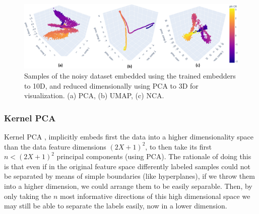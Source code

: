 \documentclass[11pt, a4paper, twoside]{article} %
\begin{document}
\begin{figure}[h!] 
     \centering 
    \includegraphics[width=0.95\linewidth]{emb1.PNG}
    \caption{ Samples of the noisy dataset embedded using the trained embedders to 10D, and reduced dimensionally using PCA to 3D for visualization. (a) PCA, (b) UMAP, (c) NCA.  }
    \label{fig:embeddings1}
\end{figure}

\vspace{-0.55cm}

\subsubsection*{Kernel PCA}\vspace{-0.2cm}
Kernel PCA \cite{KPCA}, implicitly embeds first the data into a higher dimensionality space than the data feature dimensions $(2X+1)^2$, to then take its first $n<(2X+1)^2$ principal components (using PCA). The rationale of doing this is that even if in the original feature space differently labeled samples could not be separated by means of simple boundaries (like hyperplanes), if we throw them into a higher dimension, we could arrange them to be easily separable. Then, by only taking the $n$ most informative directions of this high dimensional space we may still be able to separate the labels easily, now in a lower dimension.
\end{document}
